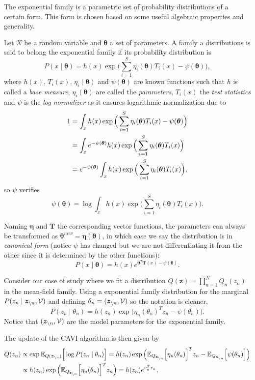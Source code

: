 
The exponential family is a parametric set of probability distributions of a certain form. This form is chosen based on some useful algebraic properties and generality.

Let \(X\) be a random variable and \(\bm{\theta}\) a set of parameters. A family a distributions is said to belong the exponential family if its probability distribution is
\[
  P(x \mid \bm{\theta}) = h(x)\exp{\Big( \sum_{i=1}^{S} \eta_{i}(\bm{\theta})T_{i}(x) - \psi(\bm{\theta}) \Big)},
\]
where \(h(x)\), \(T_{i}(x)\), \(\eta_{i}(\bm{\theta})\) and \(\psi(\bm{\theta})\)  are known functions such that \(h\) is called a \emph{base measure}, \(\eta_{i}(\bm{\theta})\) are called the \emph{parameters},  \(T_{i}(x)\) the \emph{test statistics} and \(\psi\) is the \emph{log normalizer} as it ensures logarithmic normalization due to
\[
  \begin{aligned}
    1 &= \int_{x}  h(x)\exp{\Big( \sum_{i=1}^{S} \eta_{i}(\bm{\theta})T_{i}(x) - \psi(\bm{\theta}) \Big)}\\
    &= \int_{x} e^{-\psi(\bm{\theta})} h(x)\exp{\Big( \sum_{i=1}^{S} \eta_{i}(\bm{\theta})T_{i}(x) \Big)}\\
    &= e^{-\psi(\bm{\theta})} \int_{x} h(x)\exp{\Big( \sum_{i=1}^{S} \eta_{i}(\bm{\theta})T_{i}(x) \Big)},
  \end{aligned}
\]
so \(\psi\) verifies
\[
      \psi(\bm{\theta}) = \log \int_{x} h(x) \exp \Big( \sum_{i=1}^{S} \eta_{i}(\bm{\theta})T_{i}(x) \Big).
\]

Naming \(\bm{\eta}\) and \(\bm{T}\) the corresponding vector functions, the parameters can always be transformed as \(\bm{\theta}^{new} = \bm{\eta}(\bm{\theta})\), in which case we say the distribution is in \emph{canonical form} (notice \(\psi\) has changed but we are not differentiating it from the other since it is determined by the other functions):
\[
  P(x \mid \bm{\theta}) = h(x) e^{\bm{\theta}^{T}\bm{T}(x) - \psi(\bm{\theta})}.
\]

Consider our case of study where we fit a distribution \(Q(\bm{z}) = \prod_{n=1}^{N} Q_{n}(z_{n})\) in the mean-field family. Using a exponential family distribution for the marginal \(P(z_{n} \mid \bm{z}_{\backslash n}, \mathcal{V})\) and defining \( \theta_{n} = (\bm{z}_{\backslash n}, \mathcal{V})\) so the notation is cleaner,
\[
  P(z_{n} \mid \theta_{n}) = h(z_{n})\exp \Big( {\eta_{n}(\theta_{n})}^{T}z_{n} - \psi(\theta_{n}) \Big).
\]
Notice that \( (\bm{z}_{\backslash n}, \mathcal{V}) \) are the model parameters for the exponential family.

The update of the CAVI algorithm  is then given by
  \begin{align}
    Q(z_{n}) &\propto \exp{\mathbb{E}_{Q(\bm{z}_{\backslash n})}\Big[\log P(z_{n} \mid \theta_{n})\Big]} = h(z_{n})\exp \Big(\mathbb{E}_{Q_{\bm{z}_{\backslash n}}}\Big[ {\eta_{n}(\theta_{n})}\Big]^{T}z_{n} - \mathbb{E}_{Q_{\bm{z}_{\backslash n}}}\Big[ \psi(\theta_{n})\Big]\Big) \nonumber \\
    &\propto  h(z_{n})\exp \Big(\mathbb{E}_{Q_{\bm{z}_{\backslash n}}}\Big[ {\eta_{n}(\theta_{n})}\Big]^{T}z_{n}\Big) = h(z_{n})e^{v_{n}^{T}z_{n} }, \label{eq:exponential_update}
  \end{align}

